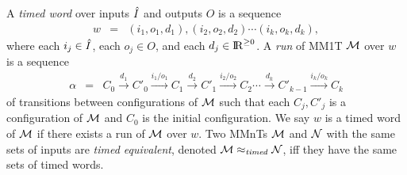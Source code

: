 A \emph{timed word} over inputs $\hat{I}$ and outputs $O$ is a sequence
\begin{eqnarray*}
w & = &  (i_1, o_1, d_1), (i_2, o_2, d_2) \cdots (i_k, o_k, d_k),
\end{eqnarray*}
where each $i_j \in \hat{I}$, each $o_j \in O$, and each $d_j \in {\rm I\!R}^{\geq 0}$.
A \emph{run} of MM1T ${\cal M}$ over $w$ is a sequence 
\begin{eqnarray*}
\alpha & = & C_0 \xrightarrow{d_1} C'_0 \xrightarrow{i_1/o_1} C_1 \xrightarrow{d_2} C'_1 \xrightarrow{i_2/o_2} C_2 \cdots
\xrightarrow{d_k} C'_{k-1} \xrightarrow{i_k/o_k} C_{k}
\end{eqnarray*}
of transitions between configurations of ${\cal M}$ such that each $C_j, C'_j$ is a configuration of ${\cal M}$ and $C_0$ is the initial configuration.
We say $w$ is a timed word of ${\cal M}$ if there exists a run of ${\cal M}$ over $w$.
Two MMnTs ${\cal M}$ and ${\cal N}$ with the same sets of inputs are \emph{timed equivalent}, denoted ${\cal M} \approx_{\mathit{timed}} {\cal N}$, iff 
they have the same sets of timed words.


